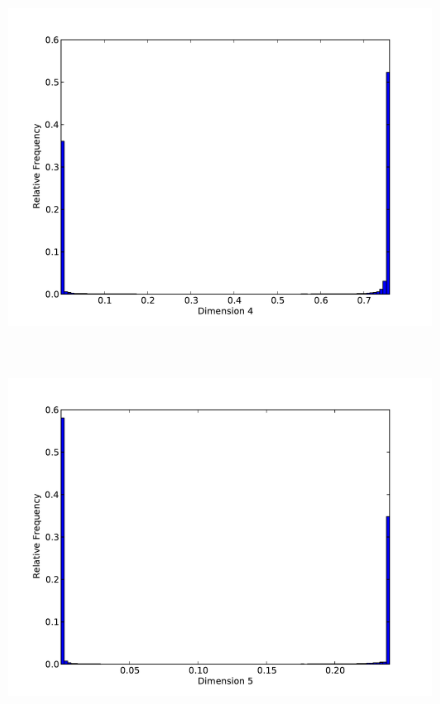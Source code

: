 \begin{figure}[h]
	\begin{center}
		\begin{subfloat}{%
			\includegraphics[scale=0.36]{figures/histograms/astrophysics_500000_3.pdf}
		}
		\end{subfloat}~
		\begin{subfloat}{%
			\includegraphics[scale=0.36]{figures/histograms/astrophysics_500000_4.pdf}
		}
		\end{subfloat}~
	\end{center}
\end{figure}

